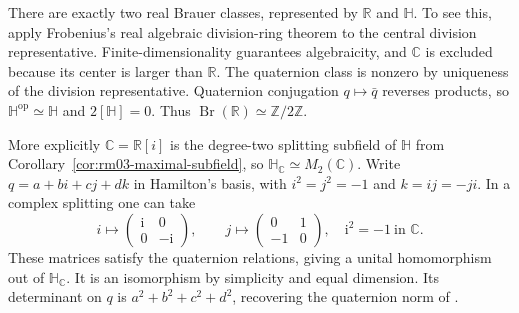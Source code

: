 \begin{example}
\label{ex:rm03-brauer-real}
There are exactly two real Brauer classes, represented by
\(\mathbb R\) and \(\mathbb H\). To see this, apply
Frobenius's real algebraic division-ring theorem
\cite[K07.23.frobenius]{d07} to the central division
representative. Finite-dimensionality guarantees
algebraicity, and \(\mathbb C\) is excluded because its
center is larger than \(\mathbb R\). The quaternion class
is nonzero by uniqueness of the division representative.
Quaternion conjugation \(q\mapsto\bar q\) reverses products,
so \(\mathbb H^{\mathrm{op}}\simeq\mathbb H\) and
\(2[\mathbb H]=0\). Thus
\(\operatorname{Br}(\mathbb R)\simeq\mathbb Z/2\mathbb Z\).

More explicitly \(\mathbb C=\mathbb R[i]\) is the degree-two
splitting subfield of \(\mathbb H\) from
Corollary~\ref{cor:rm03-maximal-subfield}, so
\(\mathbb H_{\mathbb C}\simeq M_2(\mathbb C)\).
Write \(q=a+bi+cj+dk\) in Hamilton's basis, with
\(i^2=j^2=-1\) and \(k=ij=-ji\). In a complex splitting one
can take
\[
 i\longmapsto \begin{pmatrix}\mathrm i&0\\0&-\mathrm i\end{pmatrix},
 \qquad j\longmapsto \begin{pmatrix}0&1\\-1&0\end{pmatrix},
 \quad \mathrm i^2=-1\ \text{in }\mathbb C .
\]
These matrices satisfy the quaternion relations, giving a
unital homomorphism out of \(\mathbb H_{\mathbb C}\).
It is an isomorphism by simplicity and equal dimension.
Its determinant on \(q\) is \(a^2+b^2+c^2+d^2\), recovering
the quaternion norm of \cite[K07.23.quaternion\_algebra]{d07}.
\end{example}

